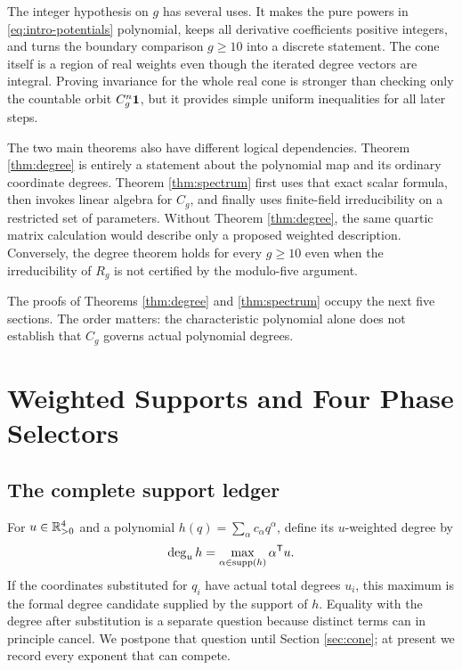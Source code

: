 \documentclass[11pt]{article}
\theoremstyle{remark}
\numberwithin{equation}{section}
\begin{document}
The integer hypothesis on \(g\) has several uses.  It makes the pure powers
in \eqref{eq:intro-potentials} polynomial, keeps all derivative
coefficients positive integers, and turns the boundary comparison
\(g\geq10\) into a discrete statement.  The cone itself is a region of real
weights even though the iterated degree vectors are integral.  Proving
invariance for the whole real cone is stronger than checking only the
countable orbit \(C_g^n\mathbf{1}\), but it provides simple uniform inequalities
for all later steps.

The two main theorems also have different logical dependencies.  Theorem
\ref{thm:degree} is entirely a statement about the polynomial map and its
ordinary coordinate degrees.  Theorem \ref{thm:spectrum} first uses that
exact scalar formula, then invokes linear algebra for \(C_g\), and finally
uses finite-field irreducibility on a restricted set of parameters.
Without Theorem \ref{thm:degree}, the same quartic matrix calculation would
describe only a proposed weighted description.  Conversely, the degree theorem
holds for every \(g\geq10\) even when the irreducibility of \(R_g\) is not
certified by the modulo-five argument.

The proofs of Theorems \ref{thm:degree} and \ref{thm:spectrum} occupy the
next five sections.  The order matters: the characteristic polynomial alone
does not establish that \(C_g\) governs actual polynomial degrees.

\section{Weighted Supports and Four Phase Selectors}\label{sec:supports}

\subsection{The complete support ledger}

For \(u\in\mathbb{R}_{>0}^4\) and a polynomial
\(h(q)=\sum_\alpha c_\alpha q^\alpha\), define its \(u\)-weighted degree by
\[
\operatorname{deg}_u h=\max_{\alpha\in\operatorname{supp}(h)}\alpha^{\mathsf{T}}u.
\]
If the coordinates substituted for \(q_i\) have actual total degrees
\(u_i\), this maximum is the formal degree candidate supplied by the
support of \(h\).  Equality with the degree after substitution is a separate
question because distinct terms can in principle cancel.  We postpone that
question until Section \ref{sec:cone}; at present we record every exponent
that can compete.
\end{document}
